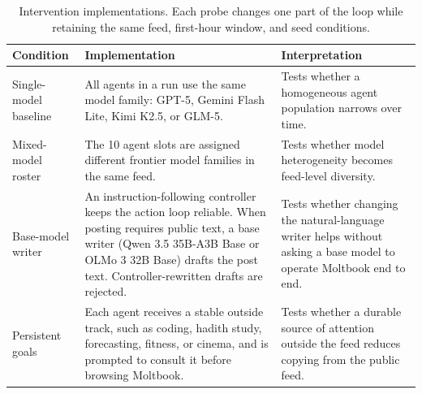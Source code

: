 \begin{table}[t]
\centering
\small
\begin{tabular}{@{}p{}p{}p{}@{}}
\toprule
Condition & Implementation & Interpretation \\
\midrule
Single-model baseline & All agents in a run use the same model family: GPT-5, Gemini Flash Lite, Kimi K2.5, or GLM-5. & Tests whether a homogeneous agent population narrows over time. \\
Mixed-model roster & The 10 agent slots are assigned different frontier model families in the same feed. & Tests whether model heterogeneity becomes feed-level diversity. \\
Base-model writer & An instruction-following controller keeps the action loop reliable. When posting requires public text, a base writer (Qwen 3.5 35B-A3B Base or OLMo 3 32B Base) drafts the post text. Controller-rewritten drafts are rejected. & Tests whether changing the natural-language writer helps without asking a base model to operate Moltbook end to end. \\
Persistent goals & Each agent receives a stable outside track, such as coding, hadith study, forecasting, fitness, or cinema, and is prompted to consult it before browsing Moltbook. & Tests whether a durable source of attention outside the feed reduces copying from the public feed. \\
\bottomrule
\end{tabular}
\caption{Intervention implementations. Each probe changes one part of the loop while retaining the same feed, first-hour window, and seed conditions.}
\label{tab:implementation-interventions}
\end{table}

